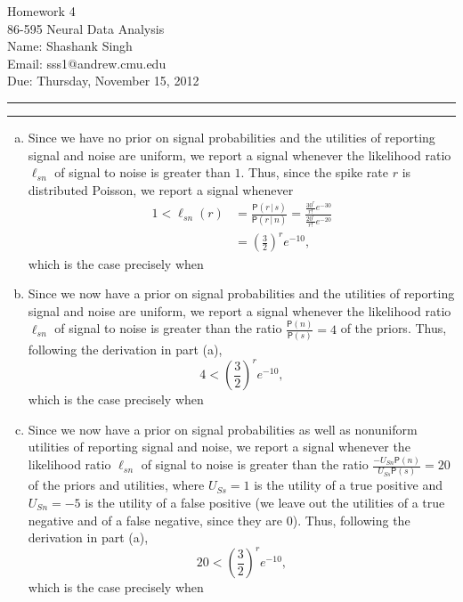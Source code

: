 \documentclass[11pt]{article}
\makeatletter
\newcounter{questionCounter}
\newcounter{partCounter}[questionCounter]
\newenvironment{question}[2][\arabic{questionCounter}]{%
    \setcounter{partCounter}{0}%
    \vspace{.25in} \hrule \vspace{0.5em}%
        \noindent{\bf #2}%
    \vspace{0.8em} \hrule \vspace{.10in}%
    \addtocounter{questionCounter}{1}%
}{}
\newcommand{\myname}{Shashank Singh}
\newcommand{\myandrew}{sss1@andrew.cmu.edu}
\newcommand{\myclass}{86-595 Neural Data Analysis}
\newcommand{\myhwnum}{4}
\newcommand{\duedate}{Thursday, November 15, 2012}
\newcommand{\pr}[1]{\mathsf{P}\left( #1 \right)} %
\newcommand{\giv}{\, | \,} %
\makeatother
\begin{document}
\thispagestyle{plain}

{\Large Homework \myhwnum} \\
\myclass \\
Name: \myname \\
Email: \myandrew \\
Due: \duedate \\
\begin{question}{Problem 1}
\begin{enumerate}[a.]
\item Since we have no prior on signal probabilities and the utilities of
reporting signal and noise are uniform, we report a signal whenever the
likelihood ratio $\ell_{sn}$ of signal to noise is greater than $1$. Thus,
since the spike rate $r$ is distributed Poisson, we report a signal whenever
\begin{align*}
1
   < \ell_{sn}(r)
 & = \frac{\pr{r \giv s}}{\pr{r \giv n}}
   = \frac{\frac{30^r}{r!}e^{-30}}{\frac{20^r}{r!}e^{-20}} \\
 & = \left( \frac32 \right)^r e^{-10},
\end{align*}
which is the case precisely when

\item Since we now have a prior on signal probabilities and the utilities of
reporting signal and noise are uniform, we report a signal whenever the
likelihood ratio $\ell_{sn}$ of signal to noise is greater than the ratio
$\frac{\pr{n}}{\pr{s}} = 4$ of the priors. Thus, following the
derivation in part (a),
\[4 < \left( \frac32 \right)^r e^{-10},\]
which is the case precisely when

\item Since we now have a prior on signal probabilities as well as nonuniform
utilities of reporting signal and noise, we report a signal whenever the
likelihood ratio $\ell_{sn}$ of signal to noise is greater than the ratio
$\frac{-U_{Sn}\pr{n}}{U_{Ss}\pr{s}} = 20$ of the priors and utilities, where
$U_{Ss} = 1$ is the utility of a true positive and $U_{Sn} = -5$ is the
utility of a false positive (we leave out the utilities of a true negative and
of a false negative, since they are $0$). Thus, following the derivation in
part (a),
\[20 < \left( \frac32 \right)^r e^{-10},\]
which is the case precisely when

\end{enumerate}
\end{question}
\end{document}
